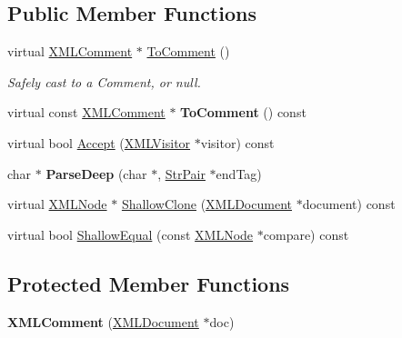 \subsection*{Public Member Functions}
\begin{DoxyCompactItemize}
\item 
virtual \hyperlink{classtinyxml2_1_1_x_m_l_comment}{X\+M\+L\+Comment} $\ast$ \hyperlink{classtinyxml2_1_1_x_m_l_comment_a8093e1dc8a34fa446d9dc3fde0e6c0ee}{To\+Comment} ()\hypertarget{classtinyxml2_1_1_x_m_l_comment_a8093e1dc8a34fa446d9dc3fde0e6c0ee}{}\label{classtinyxml2_1_1_x_m_l_comment_a8093e1dc8a34fa446d9dc3fde0e6c0ee}

\begin{DoxyCompactList}\small\item\em Safely cast to a Comment, or null. \end{DoxyCompactList}\item 
virtual const \hyperlink{classtinyxml2_1_1_x_m_l_comment}{X\+M\+L\+Comment} $\ast$ {\bfseries To\+Comment} () const \hypertarget{classtinyxml2_1_1_x_m_l_comment_a422aabac22de7d9c9cad130897dd8b1c}{}\label{classtinyxml2_1_1_x_m_l_comment_a422aabac22de7d9c9cad130897dd8b1c}

\item 
virtual bool \hyperlink{classtinyxml2_1_1_x_m_l_comment_a26a5483766029fc221dad23b9602016e}{Accept} (\hyperlink{classtinyxml2_1_1_x_m_l_visitor}{X\+M\+L\+Visitor} $\ast$visitor) const 
\item 
char $\ast$ {\bfseries Parse\+Deep} (char $\ast$, \hyperlink{classtinyxml2_1_1_str_pair}{Str\+Pair} $\ast$end\+Tag)\hypertarget{classtinyxml2_1_1_x_m_l_comment_ae3abf65920d9c86e8f90c4a239783b05}{}\label{classtinyxml2_1_1_x_m_l_comment_ae3abf65920d9c86e8f90c4a239783b05}

\item 
virtual \hyperlink{classtinyxml2_1_1_x_m_l_node}{X\+M\+L\+Node} $\ast$ \hyperlink{classtinyxml2_1_1_x_m_l_comment_a47b3cdd2e1ad9735826e2d291d483e73}{Shallow\+Clone} (\hyperlink{classtinyxml2_1_1_x_m_l_document}{X\+M\+L\+Document} $\ast$document) const 
\item 
virtual bool \hyperlink{classtinyxml2_1_1_x_m_l_comment_a3d458d319336a7fb8028979e1d91dbe9}{Shallow\+Equal} (const \hyperlink{classtinyxml2_1_1_x_m_l_node}{X\+M\+L\+Node} $\ast$compare) const 
\end{DoxyCompactItemize}
\subsection*{Protected Member Functions}
\begin{DoxyCompactItemize}
\item 
{\bfseries X\+M\+L\+Comment} (\hyperlink{classtinyxml2_1_1_x_m_l_document}{X\+M\+L\+Document} $\ast$doc)\hypertarget{classtinyxml2_1_1_x_m_l_comment_ae6463adc3edd93a8e5a9b2b7e99cdf91}{}\label{classtinyxml2_1_1_x_m_l_comment_ae6463adc3edd93a8e5a9b2b7e99cdf91}

\end{DoxyCompactItemize}

